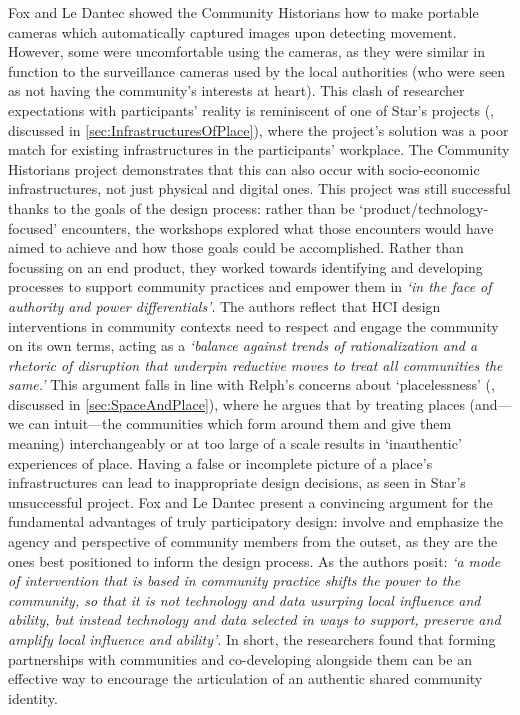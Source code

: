 Fox and Le Dantec showed the Community Historians how to make portable cameras which automatically captured images upon detecting movement. However, some were uncomfortable using the cameras, as they were similar in function to the surveillance cameras used by the local authorities (who were seen as not having the community's interests at heart). This clash of researcher expectations with participants' reality is reminiscent of one of Star's projects (\cite{Star1999}, discussed in \ref{sec:InfrastructuresOfPlace}), where the project's solution was a poor match for existing infrastructures in the participants' workplace. The Community Historians project demonstrates that this can also occur with socio-economic infrastructures, not just physical and digital ones. This project was still successful thanks to the goals of the design process: rather than be `product/technology-focused' encounters, the workshops explored what those encounters would have aimed to achieve and how those goals could be accomplished. Rather than focussing on an end product, they worked towards identifying and developing processes to support community practices and empower them in \textit{`in the face of authority and power differentials'}. The authors reflect that HCI design interventions in community contexts need to respect and engage the community on its own terms, acting as a \textit{`balance against trends of rationalization and a rhetoric of disruption that underpin reductive moves to treat all communities the same.'} This argument falls in line with Relph's concerns about `placelessness' (\cite{Relph1976}, discussed in \ref{sec:SpaceAndPlace}), where he argues that by treating places (and---we can intuit---the communities which form around them and give them meaning) interchangeably or at too large of a scale results in `inauthentic' experiences of place. Having a false or incomplete picture of a place's infrastructures can lead to inappropriate design decisions, as seen in Star's unsuccessful project. Fox and Le Dantec present a convincing argument for the fundamental advantages of truly participatory design: involve and emphasize the agency and perspective of community members from the outset, as they are the ones best positioned to inform the design process. As the authors posit: \textit{`a mode of intervention that is based in community practice shifts the power to the community, so that it is not technology and data usurping local influence and ability, but instead technology and data selected in ways to support, preserve and amplify local influence and ability'}. In short, the researchers found that forming partnerships with communities and co-developing alongside them can be an effective way to encourage the articulation of an authentic shared community identity. 

